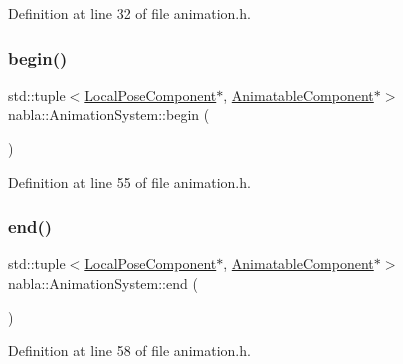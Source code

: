 Definition at line 32 of file animation.\+h.

\mbox{\label{classnabla_1_1_animation_system_adf41e641caa9f5c0f63b493693c97937}} 
\subsubsection{\texorpdfstring{begin()}{begin()}}
{\footnotesize\ttfamily std\+::tuple$<$\mbox{\hyperlink{structnabla_1_1_local_pose_component}{Local\+Pose\+Component}}$\ast$, \mbox{\hyperlink{structnabla_1_1_animatable_component}{Animatable\+Component}}$\ast$$>$ nabla\+::\+Animation\+System\+::begin (\begin{DoxyParamCaption}{ }\end{DoxyParamCaption})\hspace{0.3cm}{\ttfamily [inline]}}



Definition at line 55 of file animation.\+h.

\mbox{\label{classnabla_1_1_animation_system_aa8766d6a9b932c9ee32a396d2a633300}} 
\subsubsection{\texorpdfstring{end()}{end()}}
{\footnotesize\ttfamily std\+::tuple$<$\mbox{\hyperlink{structnabla_1_1_local_pose_component}{Local\+Pose\+Component}}$\ast$, \mbox{\hyperlink{structnabla_1_1_animatable_component}{Animatable\+Component}}$\ast$$>$ nabla\+::\+Animation\+System\+::end (\begin{DoxyParamCaption}{ }\end{DoxyParamCaption})\hspace{0.3cm}{\ttfamily [inline]}}



Definition at line 58 of file animation.\+h.

\mbox{\label{classnabla_1_1_animation_system_a2127a38740a50f1556417b0350c28c90}} 
